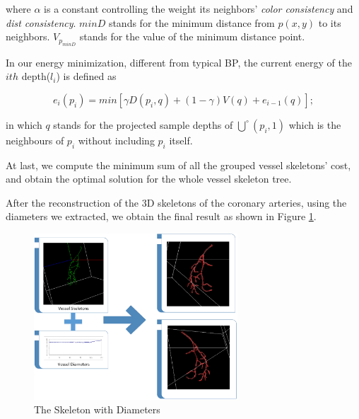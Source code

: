 where $\alpha$ is a constant controlling the weight its neighbors'
\emph{color consistency} and \emph{dist consistency}. $minD$ stands for the minimum
distance from $p(x,y)$ to its neighbors. $V_{p_{minD}}$ stands for the
value of the minimum distance point.

In our energy minimization, different from typical BP, the current energy of the $ith$
depth($l_{i}$) is defined as

\begin{equation}
e_{i}(p_{i}) = min[\gamma D(p_{i}, q) + (1-\gamma)V(q) + e_{i-1}(q)];
\end{equation}

in which $q$ stands for the projected sample depths of
$\bigcup^\circ(p_{i}, 1)$ which is the neighbours of $p_{i}$ without including $p_{i}$
itself.

At last, we compute the minimum sum of all the grouped vessel skeletons' cost,
and obtain the optimal solution for the whole vessel skeleton tree.

After the reconstruction of the 3D skeletons of the coronary arteries,
using the diameters we extracted, we obtain the final result as shown in
Figure \ref{fig:final_result}.




\begin{figure}
  \centering
  \includegraphics[width=3.0in]{final_result.png}
  \caption{The Skeleton with Diameters}
  \label{fig:final_result}
\end{figure}
